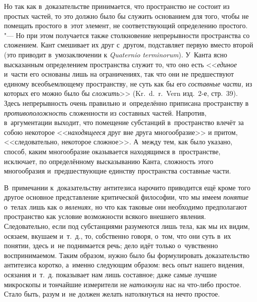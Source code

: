 Но так как в~доказательстве принимается, что пространство не состоит из
простых частей, то это должно было бы служить основанием для того, чтобы не
помещать простого в~этот элемент, не соответствующий определению простого.
"--- Но при этом получается также столкновение непрерывности пространства со
сложением. Кант смешивает их друг с~другом, подставляет первую вместо
второй (это приводит в~умозаключении к {\em Quaternio terminorum}). У~Канта
ясно высказанным определением пространства служит то,
что оно есть <<{\em единое} и~части его основаны лишь на
ограничениях, так что они не предшествуют единому всеобъемлющему
пространству, не суть как бы его {\em составные части,}
из которых его можно было бы {\em сложить}>> (Kr.~d.~r.~Vern
изд.~2-е, стр.~39). Здесь непрерывность очень правильно и~определённо
приписана пространству в {\em противоположность}
сложенности из составных частей. Напротив, в~аргументации выходит, что
помещение субстанций в~пространство влечёт за собою некоторое
<<{\em находящееся} друг вне друга многообразие>> и
притом, <<следовательно, некоторое сложное>>. А~между тем, как было указано,
способ, каким многообразие оказывается находящимся в~пространстве,
исключает, по определённому высказыванию Канта, сложность этого
многообразия и~предшествующие единству пространства составные части.

В~примечании к~доказательству антитезиса нарочито приводится ещё кроме того
другое основное представление критической философии, что мы имеем {\em понятие}
о~телах лишь как о {\em явлениях,} но что как таковые они необходимо
предполагают пространство как условие возможности всякого внешнего явления.
Следовательно, если под субстанциями разумеются лишь тела, как мы их видим,
осязаем, вкушаем и~т.~д., то, собственно говоря, о~том, что они суть в~их
понятии, здесь и~не поднимается речь; дело идёт только о~чувственно
воспринимаемом. Таким образом, нужно было бы формулировать доказательство
антитезиса коротко, а~именно следующим образом: весь опыт нашего видения,
осязания и~т.~д. показывает нам лишь составное; даже самые лучшие микроскопы и
тончайшие измерители не {\em натолкнули} нас на что-либо простое. Стало быть,
разум и~не должен желать натолкнуться на нечто простое.

